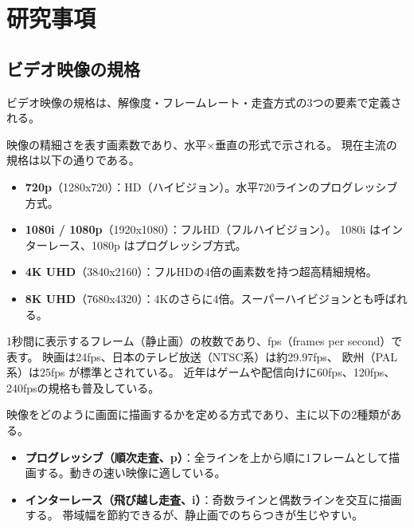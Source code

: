\documentclass[12pt,a4paper]{ltjsarticle}
\begin{document}
\section{研究事項}\label{sec:research}
  \subsection{ビデオ映像の規格}\label{subsec:research1}

  ビデオ映像の規格は、解像度・フレームレート・走査方式の3つの要素で定義される。

  \begin{description}[style=nextline, leftmargin=2em, topsep=6pt]
  \vspace{4pt}
    \item[解像度]
      映像の精細さを表す画素数であり、水平×垂直の形式で示される。
      現在主流の規格は以下の通りである。
      \begin{itemize}
        \item \textbf{720p}（1280x720）：HD（ハイビジョン）。水平720ラインのプログレッシブ方式。
        \item \textbf{1080i / 1080p}（1920x1080）：フルHD（フルハイビジョン）。
              1080i はインターレース、1080p はプログレッシブ方式。
        \item \textbf{4K UHD}（3840x2160）：フルHDの4倍の画素数を持つ超高精細規格。
        \item \textbf{8K UHD}（7680x4320）：4Kのさらに4倍。スーパーハイビジョンとも呼ばれる。
      \end{itemize}
  \vspace{4pt}
    \item[フレームレート]
      1秒間に表示するフレーム（静止画）の枚数であり、fps（frames per second）で表す。
      映画は24fps、日本のテレビ放送（NTSC系）は約29.97fps、
      欧州（PAL系）は25fps が標準とされている。
      近年はゲームや配信向けに60fps、120fps、240fpsの規格も普及している。
  \vspace{4pt}
    \item[走査方式]
      映像をどのように画面に描画するかを定める方式であり、主に以下の2種類がある。
      \begin{itemize}
        \item \textbf{プログレッシブ（順次走査、p）}：全ラインを上から順に1フレームとして描画する。動きの速い映像に適している\cite{wikipedia_progressive}。
        \item \textbf{インターレース（飛び越し走査、i）}：奇数ラインと偶数ラインを交互に描画する。
              帯域幅を節約できるが、静止画でのちらつきが生じやすい\cite{wikipedia_interlace}。
      \end{itemize}
  \end{description}
\end{document}
